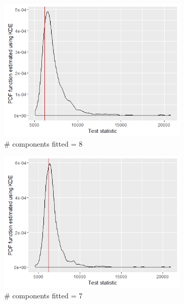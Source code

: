 \begin{figure}[!htb]
\centering
\captionsetup{justification=centering}
\begin{subfigure}[b]{0.4\textwidth}
		\includegraphics[width=\textwidth]{mainmatter/chapter_5_simulation_study/ppc_5wellsep8comp.png}
        \caption{\label{fig : ppc_5wellsep8comp} \# components fitted = 8}
	\end{subfigure}
	\begin{subfigure}[b]{0.4\textwidth}
		\includegraphics[width=\textwidth]{mainmatter/chapter_5_simulation_study/ppc_5wellsep7comp.png}
          \caption{\label{fig : ppc_5wellsep7comp}\# components fitted = 7}
	\end{subfigure}
	\begin{subfigure}[b]{0.4\textwidth}

\end{subfigure}
\end{figure}
